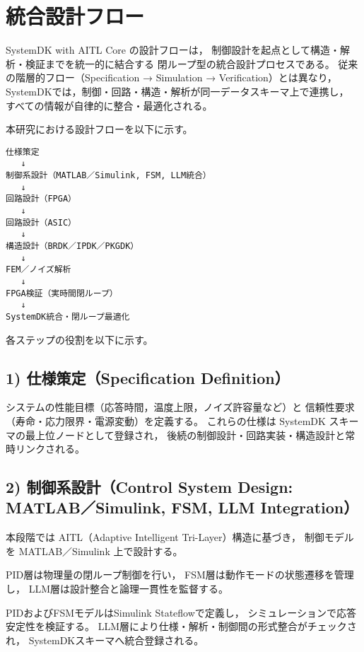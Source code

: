 \section{統合設計フロー}

SystemDK with AITL Core の設計フローは，
制御設計を起点として構造・解析・検証までを統一的に結合する
閉ループ型の統合設計プロセスである。
従来の階層的フロー（Specification → Simulation → Verification）とは異なり，
SystemDKでは，制御・回路・構造・解析が同一データスキーマ上で連携し，
すべての情報が自律的に整合・最適化される。

\vspace{1em}
\noindent 本研究における設計フローを以下に示す。

\begin{verbatim}
仕様策定
   ↓
制御系設計（MATLAB／Simulink, FSM, LLM統合）
   ↓
回路設計（FPGA）
   ↓
回路設計（ASIC）
   ↓
構造設計（BRDK／IPDK／PKGDK）
   ↓
FEM／ノイズ解析
   ↓
FPGA検証（実時間閉ループ）
   ↓
SystemDK統合・閉ループ最適化
\end{verbatim}

各ステップの役割を以下に示す。

\subsection{1) 仕様策定（Specification Definition）}
システムの性能目標（応答時間，温度上限，ノイズ許容量など）と
信頼性要求（寿命・応力限界・電源変動）を定義する。
これらの仕様は SystemDK スキーマの最上位ノードとして登録され，
後続の制御設計・回路実装・構造設計と常時リンクされる。

\subsection{2) 制御系設計（Control System Design: MATLAB／Simulink, FSM, LLM Integration）}
本段階では AITL（Adaptive Intelligent Tri-Layer）構造に基づき，
制御モデルを MATLAB／Simulink 上で設計する。

PID層は物理量の閉ループ制御を行い，
FSM層は動作モードの状態遷移を管理し，
LLM層は設計整合と論理一貫性を監督する。

PIDおよびFSMモデルはSimulink Stateflowで定義し，
シミュレーションで応答安定性を検証する。
LLM層により仕様・解析・制御間の形式整合がチェックされ，
SystemDKスキーマへ統合登録される。

